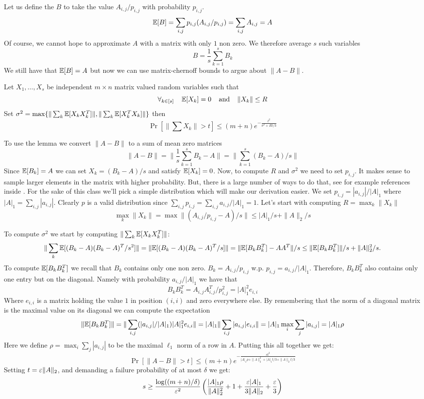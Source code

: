 \documentclass{article}
\begin{document}
Let us define the $B$ to take the value $A_{i,j}/p_{i,j}$ with probability $p_{i,j}$.
\[
{\mathbb E}[B] = \sum_{i,j} p_{i,j} (A_{i,j}/p_{i,j}) = \sum_{i,j} A_{i,j} = A
\]
Of course, we cannot hope to approximate $A$ with a matrix with only $1$ non zero. We therefore average $s$ such variables
\[
B = \frac{1}{s}\sum_{k=1}^{s}B_{k}
\]
We still have that ${\mathbb E}[B] = A$ but now we can use matrix-chernoff bounds to argue about $\|A - B\|$.
\begin{lemma}
Let $X_1,\ldots, X_s$ be independent $m \times n$ matrix valued random variables such that 
\[
\forall _{k \in [s]} \mbox{\;\;\;\;} {\mathbb E}[X_k] = 0 \mbox{\;\;\;\;and\;\;\;\;} \|X_k\| \le R
\]
Set $\sigma^2 = \max\{\|\sum_k {\mathbb E}[X_k X_k^T]\|, \|\sum_k {\mathbb E}[X_k^T X_k]\|\}$ then
\[
\Pr[\|\sum X_{k}\| > t] \le (m+n)e^{-\frac{t^2}{\sigma^2 + Rt/3}}
\]
\end{lemma}
To use the lemma we convert $\|A - B\|$ to a sum of mean zero matrices
\[
\|A - B\| = \|\frac{1}{s}\sum_{k=1}^{s} B_k - A\| = \|\sum_{k=1}^{s} (B_k - A)/s\|
\]
Since ${\mathbb E}[B_k] = A$ we can set $X_k = (B_k - A)/s$ and satisfy ${\mathbb E}[X_k] = 0$.
Now, to compute $R$ and $\sigma^2$ we need to set $p_{i,j}$. 
It makes sense to sample larger elements in the matrix with higher probability. 
But, there is a large number of ways to do that, see for example references inside  \cite{DrineasZouziasMatrixSampling10}.
For the sake of this class we'll pick a simple distribution which will make our derivation easier. 
We set $p_{i,j} = |a_{i,j}| / |A|_1$ where $|A|_1 = \sum_{i,j}|a_{i,j}|$. Clearly $p$ is a valid distribution since $\sum_{i,j}p_{i,j} =\sum_{i,j}a_{i,j}/|A|_1 =  1$.
%
Let's start with computing $R = \max_k \|X_k\|$
\[
\max_k \|X_k\| = \max \|(A_{i,j}/p_{i,j} - A)/s\| \le |A|_1/s + \|A\|_2/s 
\]

\noindent  To compute $\sigma^2$ we start by computing $\|\sum_k {\mathbb E}[X_k X_k^T]\|$:
\[
\|\sum_k {\mathbb E}[(B_k - A)(B_k -A)^T/s^2]\| = \|{\mathbb E}[(B_k - A)(B_k -A)^T/s]\| = \|{\mathbb E}[B_kB_k^T] - AA^T\|/s \le \|{\mathbb E}[B_kB_k^T]\|/s + \|A\|_2^2/s.
\]
To compute ${\mathbb E}[B_kB_k^T]$ we recall that $B_k$ contains only one non zero. $B_k = A_{i,j}/p_{i,j}$ w.p. $p_{i,j} = a_{i,j}/|A|_1$.
Therefore, $B_kB_k^T$ also contains only one entry but on the diagonal. Namely with probability $a_{i,j}/|A|_1$ we have that
\[
B_k B_k^T = A_{i,j}A_{i,j}^T /p_{i,j}^2 = |A|_1^2 e_{i,i}
\]
Where $e_{i,i}$ is a matrix holding the value $1$ in position $(i,i)$ and zero everywhere else.
By remembering that the norm of a diagonal matrix is the maximal value on its diagonal we can compute the expectation
\[
\|{\mathbb E} [B_k B_k^T]\| =  \|\sum_{i,j} (|a_{i,j}|/|A|_1) |A|_1^2 e_{i,i} \| = |A|_1  \|\sum_{i,j} |a_{i,j}|  e_{i,i} \| = |A|_1  \max_{i} \sum_{j} |a_{i,j}| = |A|_1 \rho
\]
Here we define $\rho = \max_{i} \sum_{j} |a_{i,j}|$ to be the maximal $\ell_1$ norm of a row in $A$. Putting this all together we get:
\[
\Pr[\|A - B\| > t] \le (m+n) e^{-\frac{st^2}{|A|_1 \rho + \|A\|_2^2 + |A|_1 t/3 + \|A\|_2 t /3}}
\]
Setting $t = \varepsilon \|A\|_2$, and demanding a failure probability of at most $\delta$ we get:
\[
s \ge \frac{\log((m+n)/\delta)}{\varepsilon^2}\left(\frac{|A|_1 \rho}{\|A\|_2^2} + 1 + \frac{\varepsilon |A|_1}{3\|A\|_2} + \frac{\varepsilon}{3}\right)
\]
\end{document}
